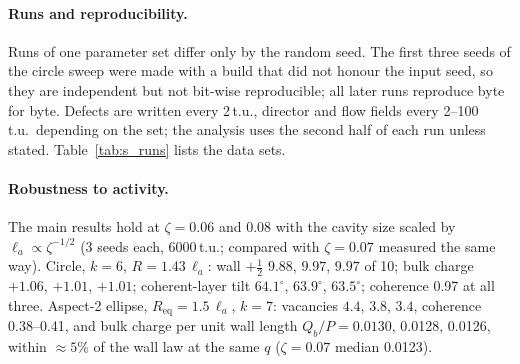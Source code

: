\documentclass[aps,prl,onecolumn,superscriptaddress,amsmath,amssymb,nofootinbib]{revtex4-2}
\newcommand{\half}{\tfrac12}
\newcommand{\la}{\ell_a}
\begin{document}
\paragraph{Runs and reproducibility.} Runs of one parameter set differ only by the random seed. The first three seeds of the circle sweep were made with a
build that did not honour the input seed, so they are independent but not bit-wise reproducible; all later runs reproduce byte for byte. Defects are written
every 2\,t.u., director and flow fields every 2--100\,t.u.\ depending on the set; the analysis uses the second half of each run unless stated.
Table~\ref{tab:s_runs} lists the data sets.
\paragraph{Robustness to activity.} The main results hold at $\zeta=0.06$ and 0.08 with the cavity size scaled by $\la\propto\zeta^{-1/2}$ (3 seeds each, 6000\,t.u.;
compared with $\zeta=0.07$ measured the same way). Circle, $k=6$, $R=1.43\,\la$: wall $+\half$ $9.88$, $9.97$, $9.97$ of 10; bulk charge $+1.06$, $+1.01$, $+1.01$;
coherent-layer tilt $64.1^\circ$, $63.9^\circ$, $63.5^\circ$; coherence 0.97 at all three. Aspect-2 ellipse, $R_\mathrm{eq}=1.5\,\la$, $k=7$: vacancies $4.4$, $3.8$, $3.4$, coherence 0.38--0.41,
and bulk charge per unit wall length $Q_b/P=0.0130$, 0.0128, 0.0126, within $\approx5\%$ of the wall law at the same $q$ ($\zeta=0.07$ median 0.0123).
\end{document}
